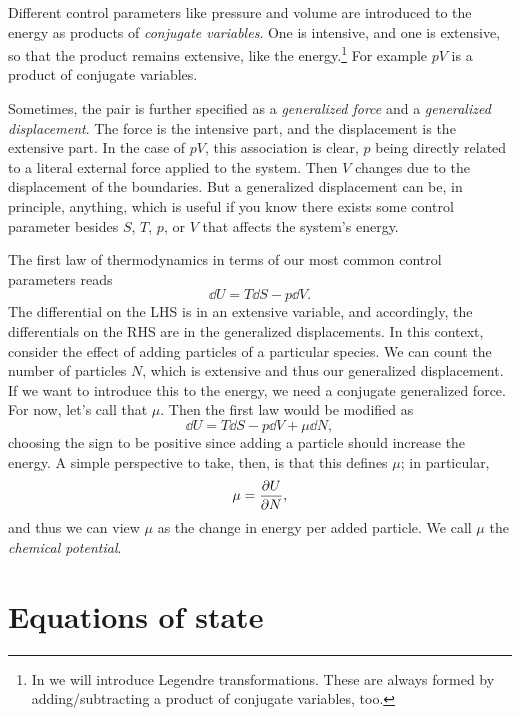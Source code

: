 Different control parameters like pressure and volume are introduced
to the energy as products of {\it conjugate variables}.
One is intensive, and one is extensive, so that the product remains extensive,
like the energy.\footnote{In  we will introduce
Legendre transformations. These are always formed by adding/subtracting a
product of conjugate variables, too.} For example $pV$ is a product of conjugate
variables. 

Sometimes, the pair is further specified as a {\it generalized
force} and a {\it generalized
displacement}. The force is the intensive part,
and the displacement is the extensive part. In the case of $pV$, this
association is clear, $p$ being directly related to a literal external force
applied to the system. Then $V$ changes due to the displacement of the
boundaries. But a generalized displacement can be, in principle, anything, which
is useful if you know there exists some control parameter besides $S$, $T$, $p$, 
or $V$ that affects the system's energy.

The first law of thermodynamics in terms of our most common control parameters
reads
\begin{equation}
  \dd{U}=T\dd{S}-p\dd{V}.
\end{equation}
The differential on the LHS is in an extensive variable, and accordingly, the
differentials on the RHS are in the generalized displacements.
In this context, consider the effect of adding particles of a particular
species. We can count the number of particles $N$, which is extensive and thus
our generalized displacement. If we want to introduce this to the energy, we
need a conjugate generalized force. For now, let's call that $\mu$. Then
the first law would be modified as 
\begin{equation}
  \dd{U}=T\dd{S}-p\dd{V}+\mu\dd{N},
\end{equation}
choosing the sign to be positive since adding a particle should increase the
energy. A simple perspective to take, then, is that this defines $\mu$; in
particular,
\begin{equation}
  \mu=\pdv{U}{N},
\end{equation}
and thus we can view $\mu$ as the change in energy per added particle.
We call $\mu$ the {\it chemical potential}.

\section{Equations of state}\label{sec:EoS}


